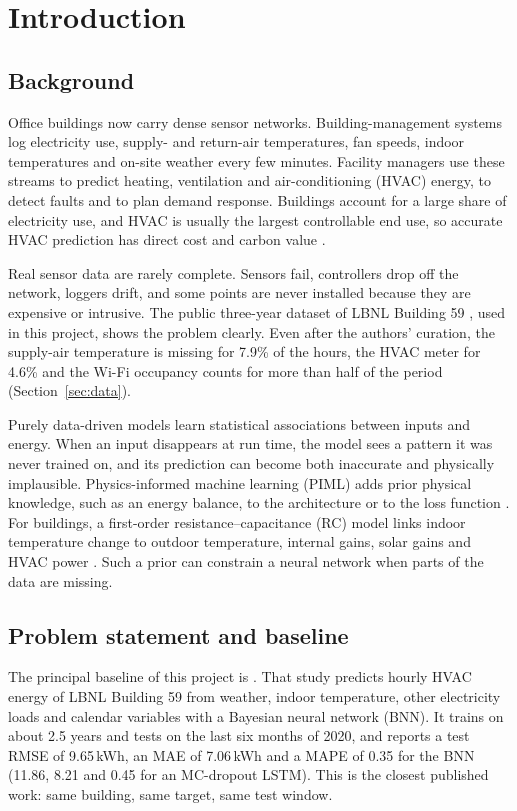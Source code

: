 \section{Introduction}\label{sec:intro}

\subsection{Background}
Office buildings now carry dense sensor networks. Building-management systems log electricity use, supply- and return-air temperatures, fan speeds, indoor temperatures and on-site weather every few minutes. Facility managers use these streams to predict heating, ventilation and air-conditioning (HVAC) energy, to detect faults and to plan demand response. Buildings account for a large share of electricity use, and HVAC is usually the largest controllable end use, so accurate HVAC prediction has direct cost and carbon value \citep{amasyali2018review}.

Real sensor data are rarely complete. Sensors fail, controllers drop off the network, loggers drift, and some points are never installed because they are expensive or intrusive. The public three-year dataset of LBNL Building 59 \citep{luo2022dataset}, used in this project, shows the problem clearly. Even after the authors' curation, the supply-air temperature is missing for 7.9\% of the hours, the HVAC meter for 4.6\% and the Wi-Fi occupancy counts for more than half of the period (Section~\ref{sec:data}).

Purely data-driven models learn statistical associations between inputs and energy. When an input disappears at run time, the model sees a pattern it was never trained on, and its prediction can become both inaccurate and physically implausible. Physics-informed machine learning (PIML) adds prior physical knowledge, such as an energy balance, to the architecture or to the loss function \citep{karniadakis2021piml,raissi2019pinn}. For buildings, a first-order resistance--capacitance (RC) model links indoor temperature change to outdoor temperature, internal gains, solar gains and HVAC power \citep{bacher2011greybox}. Such a prior can constrain a neural network when parts of the data are missing.

\subsection{Problem statement and baseline}
The principal baseline of this project is \citet{mahajan2024bnn}. That study predicts hourly HVAC energy of LBNL Building 59 from weather, indoor temperature, other electricity loads and calendar variables with a Bayesian neural network (BNN). It trains on about 2.5 years and tests on the last six months of 2020, and reports a test RMSE of 9.65\,kWh, an MAE of 7.06\,kWh and a MAPE of 0.35 for the BNN (11.86, 8.21 and 0.45 for an MC-dropout LSTM). This is the closest published work: same building, same target, same test window.

